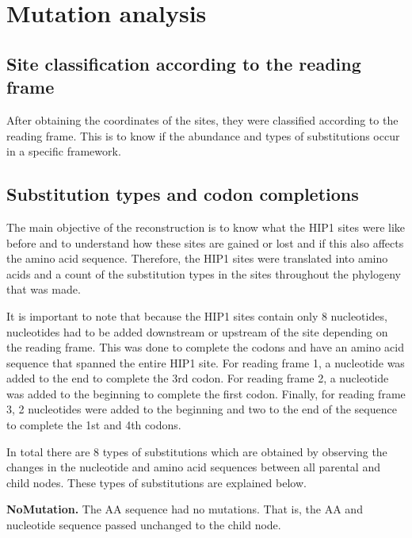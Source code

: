 \documentclass[
]{book}
\begin{document}
\hypertarget{mutation-analysis}{%
\section{Mutation analysis}\label{mutation-analysis}}

\hypertarget{site-classification-according-to-the-reading-frame}{%
\subsection{Site classification according to the reading frame}\label{site-classification-according-to-the-reading-frame}}

After obtaining the coordinates of the sites, they were classified according to the reading frame. This is to know if the abundance and types of substitutions occur in a specific framework.

\hypertarget{substitution-types-and-codon-completions}{%
\subsection{Substitution types and codon completions}\label{substitution-types-and-codon-completions}}

The main objective of the reconstruction is to know what the HIP1 sites were like before and to understand how these sites are gained or lost and if this also affects the amino acid sequence. Therefore, the HIP1 sites were translated into amino acids and a count of the substitution types in the sites throughout the phylogeny that was made.

It is important to note that because the HIP1 sites contain only 8 nucleotides, nucleotides had to be added downstream or upstream of the site depending on the reading frame. This was done to complete the codons and have an amino acid sequence that spanned the entire HIP1 site. For reading frame 1, a nucleotide was added to the end to complete the 3rd codon. For reading frame 2, a nucleotide was added to the beginning to complete the first codon. Finally, for reading frame 3, 2 nucleotides were added to the beginning and two to the end of the sequence to complete the 1st and 4th codons.

In total there are 8 types of substitutions which are obtained by observing the changes in the nucleotide and amino acid sequences between all parental and child nodes. These types of substitutions are explained below.

\textbf{NoMutation.} The AA sequence had no mutations. That is, the AA and nucleotide sequence passed unchanged to the child node.
\end{document}
